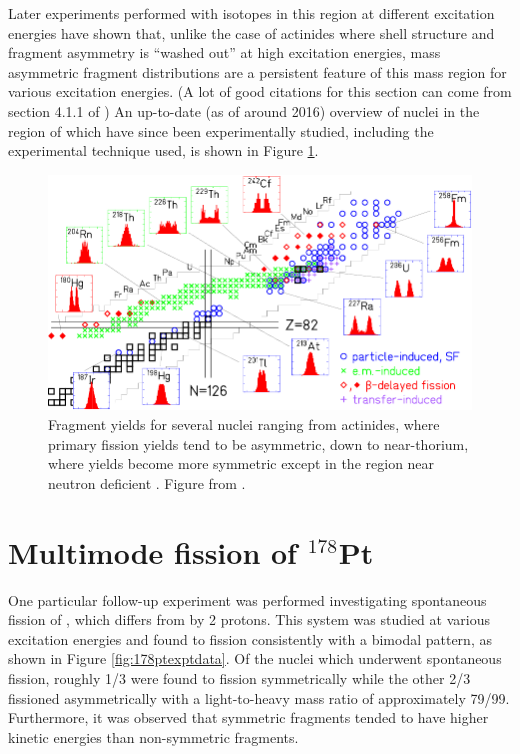 Later experiments performed with isotopes in this region at different excitation energies have shown that, unlike the case of actinides where shell structure and fragment asymmetry is ``washed out'' at high excitation energies, mass asymmetric fragment distributions are a persistent feature of this mass region for various excitation energies. (A lot of good citations for this section can come from section 4.1.1 of \cite{Andreyev2018}) An up-to-date (as of around 2016) overview of nuclei in the region of {\Hg} which have since been experimentally studied, including the experimental technique used, is shown in Figure \ref{fig:178ptregion}.

\begin{figure}
	\includegraphics[width=0.9\linewidth]{./TeX_files/178Pt_region}
	\caption[Survey of fragment yields near $^{180}$Hg]{Fragment yields for several nuclei ranging from actinides, where primary fission yields tend to be asymmetric, down to near-thorium, where yields become more symmetric except in the region near neutron deficient {\Hg}. Figure from \cite{Andreyev2018}.}
	\label{fig:178ptregion}
\end{figure}



\section{Multimode fission of $^{178}$Pt}

One particular follow-up experiment was performed investigating spontaneous fission of {\Pt} \cite{our-Pt-paper}, which differs from {\Hg} by 2 protons. This system was studied at various excitation energies and found to fission consistently with a bimodal pattern, as shown in Figure \ref{fig:178ptexptdata}. Of the nuclei which underwent spontaneous fission, roughly 1/3 were found to fission symmetrically while the other 2/3 fissioned asymmetrically with a light-to-heavy mass ratio of approximately 79/99. Furthermore, it was observed that symmetric fragments tended to have higher kinetic energies than non-symmetric fragments.

